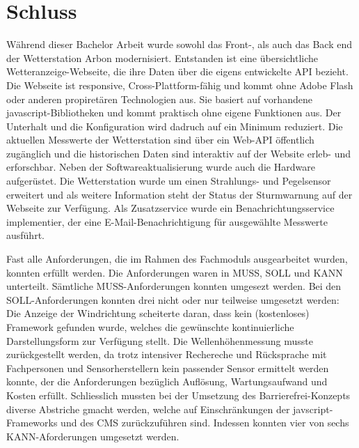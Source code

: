 \section*{Schluss}



Während dieser Bachelor Arbeit wurde sowohl das Front-, als auch das Back end der Wetterstation Arbon modernisiert. Entstanden ist eine übersichtliche Wetteranzeige-Webseite, die ihre Daten über die eigens entwickelte API bezieht. Die Webseite ist responsive, Cross-Plattform-fähig und kommt ohne Adobe Flash oder anderen propiretären Technologien aus. Sie basiert auf vorhandene javascript-Bibliotheken und kommt praktisch ohne eigene Funktionen aus. Der Unterhalt und die Konfiguration wird dadruch auf ein Minimum reduziert. Die aktuellen Messwerte der Wetterstation sind über ein Web-API öffentlich zugänglich und die historischen Daten sind interaktiv auf der Website erleb- und erforschbar. Neben der Softwareaktualisierung wurde auch die Hardware aufgerüstet. Die Wetterstation wurde um einen Strahlungs- und Pegelsensor erweitert und als weitere Information steht der Status der Sturmwarnung auf der Webseite zur Verfügung. Als Zusatzservice wurde ein Benachrichtungsservice implementier, der eine E-Mail-Benachrichtigung für ausgewählte Messwerte ausführt.
\newline



Fast alle Anforderungen, die im Rahmen des Fachmoduls ausgearbeitet wurden, konnten erfüllt werden. Die Anforderungen waren in MUSS, SOLL und KANN unterteilt. Sämtliche MUSS-Anforderungen konnten umgesezt werden. Bei den SOLL-Anforderungen konnten drei nicht oder nur teilweise umgesetzt werden: Die Anzeige der Windrichtung scheiterte daran, dass kein (kostenloses) Framework gefunden wurde, welches die gewünschte kontinuierliche Darstellungsform zur Verfügung stellt. Die Wellenhöhenmessung musste zurückgestellt werden, da trotz intensiver Rechereche und Rücksprache mit Fachpersonen und Sensorherstellern kein passender
Sensor ermittelt werden konnte, der die Anforderungen bezüglich Auflösung, Wartungsaufwand und Kosten erfüllt. Schliesslich mussten bei der Umsetzung des Barrierefrei-Konzepts diverse Abstriche gmacht werden, welche auf Einschränkungen der javscript-Frameworks und des CMS zurückzuführen sind. Indessen konnten vier von sechs KANN-Aforderungen umgesetzt werden.
\newline

